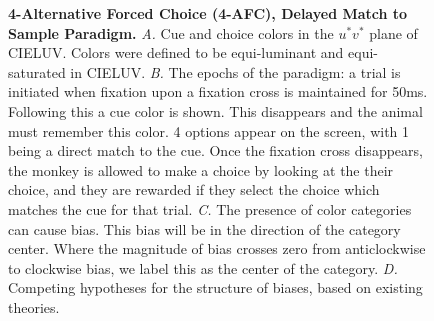 \begin{figure}
    
    \caption{\textbf{4-Alternative Forced Choice (4-AFC), Delayed Match to Sample Paradigm.}
    \emph{A.} Cue and choice colors in the $u^*v^*$ plane of CIELUV. Colors were defined to be equi-luminant and equi-saturated in CIELUV.
    \emph{B.} The epochs of the paradigm: a trial is initiated when fixation upon a fixation cross is maintained for 50ms. Following this a cue color is shown. This disappears and the animal must remember this color. 4 options appear on the screen, with 1 being a direct match to the cue. Once the fixation cross disappears, the monkey is allowed to make a choice by looking at the their choice, and they are rewarded if they select the choice which matches the cue for that trial.
    \emph{C.} The presence of color categories can cause bias. This bias will be in the direction of the category center.
    Where the magnitude of bias crosses zero from anticlockwise to clockwise bias, we label this as the center of the category.
    \emph{D.} Competing hypotheses for the structure of biases, based on existing theories.
} 
    \label{fig:ParadigmAnalysisPredictions}
    
\end{figure}

